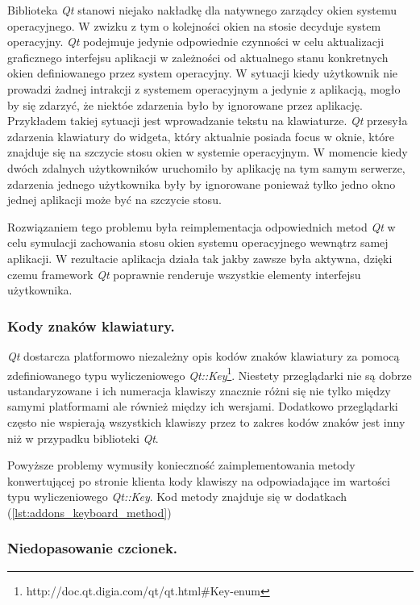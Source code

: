 Biblioteka \emph{Qt} stanowi niejako nakładkę dla natywnego zarządcy okien systemu operacyjnego. W zwizku z tym o kolejności okien na stosie decyduje system operacyjny. \emph{Qt} podejmuje jedynie odpowiednie czynności w celu aktualizacji graficznego interfejsu aplikacji w zależności od aktualnego stanu konkretnych okien definiowanego przez system operacyjny. W sytuacji kiedy użytkownik nie prowadzi żadnej intrakcji z systemem operacyjnym a jedynie z aplikacją, mogło by się zdarzyć, że niektóe zdarzenia było by ignorowane przez aplikację. Przykładem takiej sytuacji jest wprowadzanie tekstu na klawiaturze. \emph{Qt} przesyła zdarzenia klawiatury do widgeta, który aktualnie posiada focus w oknie, które znajduje się na szczycie stosu okien w systemie operacyjnym. W momencie kiedy dwóch zdalnych użytkowników uruchomiło by aplikację na tym samym serwerze, zdarzenia jednego użytkownika były by ignorowane ponieważ tylko jedno okno jednej aplikacji może być na szczycie stosu. 

Rozwiązaniem tego problemu była reimplementacja odpowiednich metod \emph{Qt} w celu symulacji zachowania stosu okien systemu operacyjnego wewnątrz samej aplikacji. W rezultacie aplikacja działa tak jakby zawsze była aktywna, dzięki czemu framework \emph{Qt} poprawnie renderuje wszystkie elementy interfejsu użytkownika.

\subsubsection{Kody znaków klawiatury.}
\label{problems_keyboard}

\emph{Qt} dostarcza platformowo niezależny opis kodów znaków klawiatury za pomocą zdefiniowanego typu wyliczeniowego \emph{Qt::Key}\footnote{http://doc.qt.digia.com/qt/qt.html\#Key-enum}. Niestety przeglądarki nie są dobrze ustandaryzowane i ich numeracja klawiszy znacznie różni się nie tylko między samymi platformami ale również między ich wersjami. Dodatkowo przeglądarki często nie wspierają wszystkich klawiszy przez to zakres kodów znaków jest inny niż w przypadku biblioteki \emph{Qt}.

Powyższe problemy wymusiły konieczność zaimplementowania metody konwertującej po stronie klienta kody klawiszy na odpowiadające im wartości typu wyliczeniowego \emph{Qt::Key}. Kod metody znajduje się w dodatkach (\ref{lst:addons_keyboard_method})

\subsubsection{Niedopasowanie czcionek.}
\label{problems_fonts}

